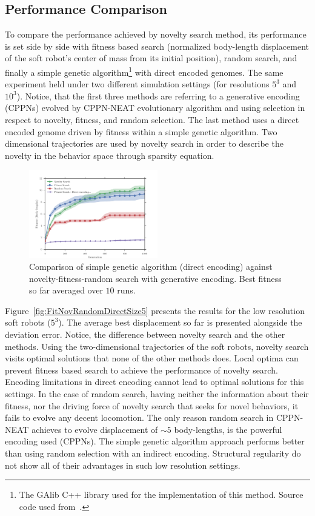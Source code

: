 \documentclass{sig-alternate}
\begin{document}
\subsection{Performance Comparison}

To compare the performance achieved by novelty search method, its performance is set side by side with fitness based search (normalized body-length displacement of the soft robot's center of mass from its initial position), random search, and finally a simple genetic algorithm\footnote{The GAlib C++ library \cite{wall1996galib} used for the implementation of this method. Source code used from~\cite{cheney2013unshackling}.} with direct encoded genomes. The same experiment held under two different simulation settings (for resolutions $5^3$ and $10^3$). Notice, that the first three methods are referring to a generative encoding (CPPNs) evolved by CPPN-NEAT evolutionary algorithm and using selection in respect to novelty, fitness, and random selection. The last method uses a direct encoded genome driven by fitness within a simple genetic algorithm. Two dimensional trajectories are used by novelty search in order to describe the novelty in the behavior space through sparsity equation.

\begin{figure}[t!]
\centering
\includegraphics[width=0.5\textwidth]{../Figures/Results/FitvsNovVsDirSize10.pdf}
\caption{Comparison of simple genetic algorithm (direct encoding) against novelty-fitness-random search with generative encoding. Best fitness so far averaged over $10$ runs.}
\label{fig:FitvsNovVsDirSize10}
\end{figure} 

Figure~\ref{fig:FitNovRandomDirectSize5} presents the results for the low resolution soft robots ($5^3$). The average best displacement so far is presented alongside the deviation error. Notice, the difference between novelty search and the other methods. Using the two-dimensional trajectories of the soft robots, novelty search visits optimal solutions that none of the other methods does. Local optima can prevent fitness based search to achieve the performance of novelty search. Encoding limitations in direct encoding cannot lead to optimal solutions for this settings. In the case of random search, having neither the information about their fitness, nor the driving force of novelty search that seeks for novel behaviors, it fails to evolve any decent locomotion. The only reason random search in CPPN-NEAT achieves to evolve displacement of $\sim 5$ body-lengths, is the powerful encoding used (CPPNs). The simple genetic algorithm approach performs better than using random selection with an indirect encoding. Structural regularity do not show all of their advantages in such low resolution settings.
\end{document}
